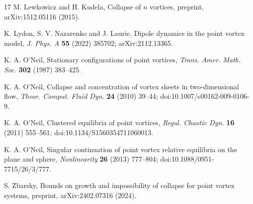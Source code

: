 \documentclass[11pt]{article}
\theoremstyle{definition}
\begin{document}
\begin{thebibliography}{17}
 M. Lewkowicz and H. Kudela, Collapse of $n$ vortices, preprint, arXiv:1512.05116 (2015).

 K. Lydon, S. V. Nazarenko and J. Laurie, Dipole dynamics in the point vortex model, \emph{J. Phys. A} \textbf{55} (2022) 385702; arXiv:2112.13365.

 K. A. O'Neil, Stationary configurations of point vortices, \emph{Trans. Amer. Math. Soc.} \textbf{302} (1987) 383--425.

 K. A. O'Neil, Collapse and concentration of vortex sheets in two-dimensional flow, \emph{Theor. Comput. Fluid Dyn.} \textbf{24} (2010) 39--44; doi:10.1007/s00162-009-0106-9.

 K. A. O'Neil, Clustered equilibria of point vortices, \emph{Regul. Chaotic Dyn.} \textbf{16} (2011) 555--561; doi:10.1134/S1560354711060013.

 K. A. O'Neil, Singular continuation of point vortex relative equilibria on the plane and sphere, \emph{Nonlinearity} \textbf{26} (2013) 777--804; doi:10.1088/0951-7715/26/3/777.

 S. Zbarsky, Bounds on growth and impossibility of collapse for point vortex systems, preprint, arXiv:2402.07316 (2024).

\end{thebibliography}
\end{document}
